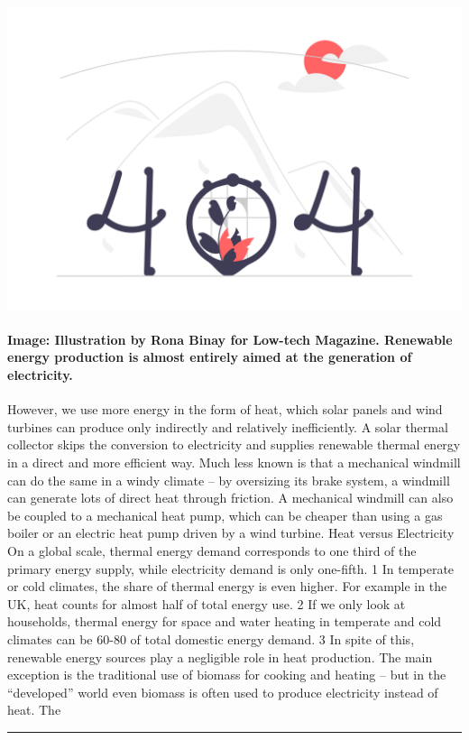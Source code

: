\documentclass[10pt,a4paper]{article}
\begin{document}
\begin{minipage}[t]{0.80\linewidth}
\vspace{0pt}
\begin{multicols}{2}

    \href{https://solar.lowtechmagazine.com/2019/02/heat-your-house-with-a-mechanical-windmill/?utm\_source=hackernewsletter\&utm\_medium=email\&utm\_term=fav}{
        \includegraphics[width=0.99\linewidth]{notfound.png}
    }
  
\paragraph{Image: Illustration by Rona Binay for Low-tech Magazine.
Renewable energy production is almost entirely aimed at the generation of electricity.}
 However, we use more energy in the form of heat, which solar panels and wind turbines can produce only indirectly and relatively inefficiently. A solar thermal collector skips the conversion to electricity and supplies renewable thermal energy in a direct and more efficient way.
Much less known is that a mechanical windmill can do the same in a windy climate – by oversizing its brake system, a windmill can generate lots of direct heat through friction. A mechanical windmill can also be coupled to a mechanical heat pump, which can be cheaper than using a gas boiler or an electric heat pump driven by a wind turbine.
Heat versus Electricity
On a global scale, thermal energy demand corresponds to one third of the primary energy supply, while electricity demand is only one-fifth. 1 In temperate or cold climates, the share of thermal energy is even higher. For example in the UK, heat counts for almost half of total energy use. 2 If we only look at households, thermal energy for space and water heating in temperate and cold climates can be 60-80 of total domestic energy demand. 3
In spite of this, renewable energy sources play a negligible role in heat production. The main exception is the traditional use of biomass for cooking and heating – but in the “developed” world even biomass is often used to produce electricity instead of heat. The 

\end{multicols}
\end{minipage}
\par\medskip
\noindent\textcolor{red}{\rule{\linewidth}{0.2mm}}
\end{document}
